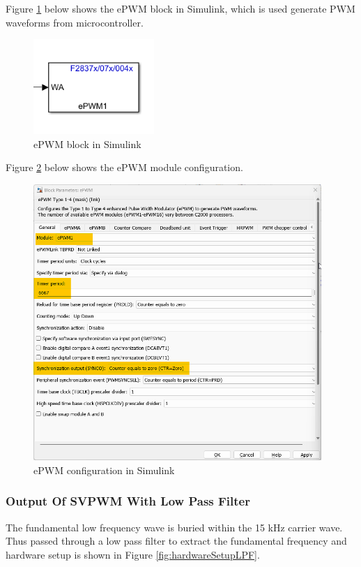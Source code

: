 Figure \ref{fig:svpwm_block} below shows the ePWM block in Simulink, which is used generate PWM waveforms from microcontroller.

\begin{figure}
	\centering
	\includegraphics[width=1.8in]{sections/section6/images/SVPWM/ePWMBlock.png}
	\caption{ePWM block in Simulink}
	\label{fig:svpwm_block}
\end{figure}

Figure \ref{fig:ePWMTBPRD} below shows the ePWM module configuration.

\begin{figure}
	\centering
	\includegraphics[width=4.3in]{sections/section6/images/SVPWM/ePWMTBPRD.png}
	\caption{ePWM configuration in Simulink}
	\label{fig:ePWMTBPRD}
\end{figure}

\subsubsection{Output Of SVPWM With Low Pass Filter}


The fundamental low frequency wave is buried within the 15 kHz carrier wave. Thus passed through a low pass filter to extract the fundamental frequency and hardware setup is shown in Figure \ref{fig:hardwareSetupLPF}.

